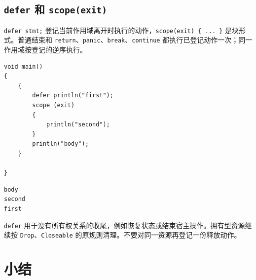 \subsection*{\texttt{defer} 和 \texttt{scope(\allowbreak{}exit)\allowbreak{}}}

\texttt{defer stmt;} 登记当前作用域离开时执行的动作，\texttt{scope(\allowbreak{}exit)\allowbreak{} \{ .\allowbreak{}.\allowbreak{}.\allowbreak{} \}} 是块形式。普通结束和 \texttt{return}、\texttt{panic}、\texttt{break}、\texttt{continue} 都执行已登记动作一次；同一作用域按登记的逆序执行。

\par
\medskip
\begin{lstlisting}[style=chali]
void main()
{
    {
        defer println("first");
        scope (exit)
        {
            println("second");
        }
        println("body");
    }

}
\end{lstlisting}
\par
\medskip

\par
\medskip
\begin{lstlisting}[style=out]
body
second
first
\end{lstlisting}
\par
\medskip

\texttt{defer} 用于没有所有权关系的收尾，例如恢复状态或结束宿主操作。拥有型资源继续按 \texttt{Drop}、\texttt{Closeable} 的原规则清理。不要对同一资源再登记一份释放动作。

\section{小结}

